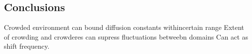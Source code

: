 \subsection{Conclusions} 
Crowded environment can bound diffusion constants withincertain range 
Extent of crowding and crowderes can supress fluctuations betweebn domains 
Can act as shift frequency. 

%
%
%	
	
